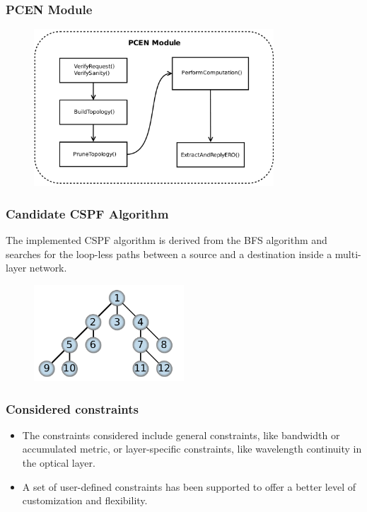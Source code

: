 \documentclass{beamer}
\begin{document}
\frame
{
  \frametitle{PCEN Module}
  
  \begin{figure}[!htbp]
    \begin{center}
      \includegraphics[width=0.8\textwidth]{img/pcen_module}
    \end{center}
  \end{figure}
}
\frame
{
  \frametitle{Candidate CSPF Algorithm}

  The implemented CSPF algorithm is derived from the BFS algorithm and
  searches for the loop-less paths between a source and a destination
  inside a multi-layer network.

  \begin{figure}[!htbp]
    \begin{center}
      \includegraphics[width=0.5\textwidth]{img/bfs_graph}
    \end{center}
  \end{figure}
}
\frame
{
  \frametitle{Considered constraints}

  \begin{itemize}
  \item The constraints considered include general constraints, like
    bandwidth or accumulated metric, or layer-specific constraints,
    like wavelength continuity in the optical layer.
  \item A set of user-defined constraints has been supported to offer
    a better level of customization and flexibility.
  \end{itemize}
}
\end{document}
